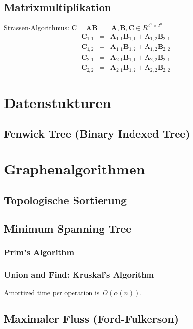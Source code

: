 \documentclass[10pt,a4paper,ngerman]{article}
\begin{document}
\begin{multicols}{2}
\subsection{Matrixmultiplikation}
Strassen-Algorithmus: $\mathbf{C} = \mathbf{A} \mathbf{B} \qquad \mathbf{A},\mathbf{B},\mathbf{C} \in R^{2^n \times 2^n}$
\begin{eqnarray*}
\mathbf{C}_{1,1} & =& \mathbf{A}_{1,1} \mathbf{B}_{1,1} + \mathbf{A}_{1,2} \mathbf{B}_{2,1} \\
\mathbf{C}_{1,2} &=& \mathbf{A}_{1,1} \mathbf{B}_{1,2} + \mathbf{A}_{1,2} \mathbf{B}_{2,2}\\
\mathbf{C}_{2,1} &=& \mathbf{A}_{2,1} \mathbf{B}_{1,1} + \mathbf{A}_{2,2} \mathbf{B}_{2,1} \\
\mathbf{C}_{2,2} &=& \mathbf{A}_{2,1} \mathbf{B}_{1,2} + \mathbf{A}_{2,2} \mathbf{B}_{2,2}
\end{eqnarray*}
\section{Datenstukturen}
\subsection{Fenwick Tree (Binary Indexed Tree)}


\section{Graphenalgorithmen}
\subsection{Topologische Sortierung}

\subsection{Minimum Spanning Tree}
\subsubsection{Prim's Algorithm}

\subsubsection{Union and Find: Kruskal's Algorithm}
Amortized time per operation is~$O(\alpha(n))$.

\subsection{Maximaler Fluss (Ford-Fulkerson)}


%


\end{multicols}
\end{document}
